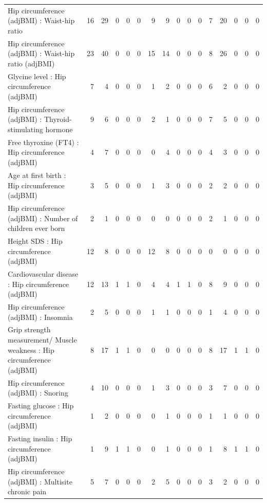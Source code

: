 \begin{table}[ht]
\begin{tabular}{lrrrrrrrrrrrrrrr}
  Hip circumference (adjBMI) : Waist-hip ratio  &  16 &  29 &   0 &   0 &   0 &   9 &   9 &   0 &   0 &   0 &   7 &  20 &   0 &   0 &   0 \\ 
  Hip circumference (adjBMI) : Waist-hip ratio (adjBMI) &  23 &  40 &   0 &   0 &   0 &  15 &  14 &   0 &   0 &   0 &   8 &  26 &   0 &   0 &   0 \\ 
  Glycine level  : Hip circumference (adjBMI) &   7 &   4 &   0 &   0 &   0 &   1 &   2 &   0 &   0 &   0 &   6 &   2 &   0 &   0 &   0 \\ 
  Hip circumference (adjBMI) : Thyroid-stimulating hormone  &   9 &   6 &   0 &   0 &   0 &   2 &   1 &   0 &   0 &   0 &   7 &   5 &   0 &   0 &   0 \\ 
  Free thyroxine (FT4) : Hip circumference (adjBMI) &   4 &   7 &   0 &   0 &   0 &   0 &   4 &   0 &   0 &   0 &   4 &   3 &   0 &   0 &   0 \\ 
  Age at first birth  : Hip circumference (adjBMI) &   3 &   5 &   0 &   0 &   0 &   1 &   3 &   0 &   0 &   0 &   2 &   2 &   0 &   0 &   0 \\ 
  Hip circumference (adjBMI) : Number of children ever born  &   2 &   1 &   0 &   0 &   0 &   0 &   0 &   0 &   0 &   0 &   2 &   1 &   0 &   0 &   0 \\ 
  Height SDS : Hip circumference (adjBMI) &  12 &   8 &   0 &   0 &   0 &  12 &   8 &   0 &   0 &   0 &   0 &   0 &   0 &   0 &   0 \\ 
  Cardiovascular disease : Hip circumference (adjBMI) &  12 &  13 &   1 &   1 &   0 &   4 &   4 &   1 &   1 &   0 &   8 &   9 &   0 &   0 &   0 \\ 
  Hip circumference (adjBMI) : Insomnia &   2 &   5 &   0 &   0 &   0 &   1 &   1 &   0 &   0 &   0 &   1 &   4 &   0 &   0 &   0 \\ 
  Grip strength measurement/ Muscle weakness : Hip circumference (adjBMI) &   8 &  17 &   1 &   1 &   0 &   0 &   0 &   0 &   0 &   0 &   8 &  17 &   1 &   1 &   0 \\ 
  Hip circumference (adjBMI) : Snoring &   4 &  10 &   0 &   0 &   0 &   1 &   3 &   0 &   0 &   0 &   3 &   7 &   0 &   0 &   0 \\ 
  Fasting glucose : Hip circumference (adjBMI) &   1 &   2 &   0 &   0 &   0 &   0 &   1 &   0 &   0 &   0 &   1 &   1 &   0 &   0 &   0 \\ 
  Fasting insulin : Hip circumference (adjBMI) &   1 &   9 &   1 &   1 &   0 &   0 &   1 &   0 &   0 &   0 &   1 &   8 &   1 &   1 &   0 \\ 
  Hip circumference (adjBMI) : Multisite chronic pain &   5 &   7 &   0 &   0 &   0 &   2 &   5 &   0 &   0 &   0 &   3 &   2 &   0 &   0 &   0 \\ 

\end{tabular}
\end{table}
